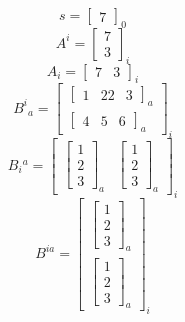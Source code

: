 \[
    s=\left[\begin{array}{c}7\end{array}\right]_{0}
\]
\[
    A^i=\left[\begin{array}{c}
            7
            \\
            3
        \end{array}\right]_{i}
\]
\[
    A_i=\left[\begin{array}{cc}7&3\end{array}\right]_{i}
\]
\[
    B^i{}_a=\left[\begin{array}{cc}
            \left[\begin{array}{lll}1&22&3\end{array}\right]_{a}
            \\
            \left[\begin{array}{lll}4&5&6\end{array}\right]_{a}
        \end{array}\right]_{i}
\]
\[
    B_i{}^a=\left[\begin{array}{cc}
            \left[\begin{array}{lll}
                          1
                          \\
                          2
                          \\
                          3\end{array}\right]_{a}
             &
            \left[\begin{array}{lll}
                          1
                          \\
                          2
                          \\
                          3\end{array}\right]_{a}
        \end{array}\right]_{i}
\]
\[
    B^{ia}=\left[\begin{array}{cc}
            \left[\begin{array}{lll}
                          1
                          \\
                          2
                          \\
                          3\end{array}\right]_{a}
            \\
            \left[\begin{array}{lll}
                          1
                          \\
                          2
                          \\
                          3\end{array}\right]_{a}
        \end{array}\right]_{i}
\]
